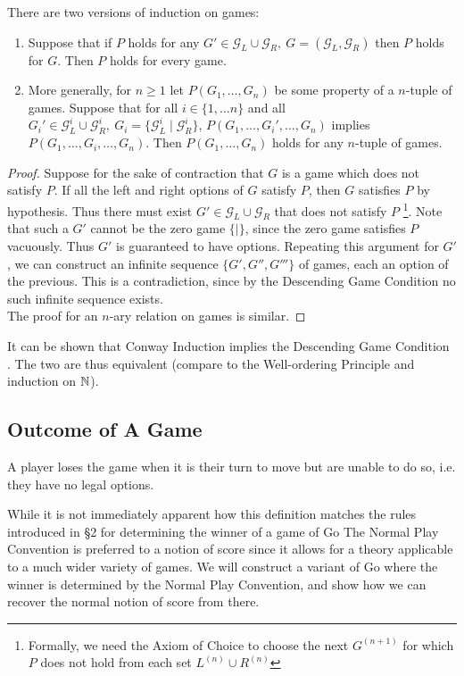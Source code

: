 \documentclass[../math194_paper.tex]{subfiles}
\begin{document}
\begin{theorem} There are two versions of induction on games:
\label{induction}
\begin{enumerate}
    \item Suppose that if $P$ holds for any $G' \in \mathcal{G}_L \cup \mathcal{G}_R, \: 
    G = (\mathcal{G}_L, \mathcal{G}_R)$ then $P$ holds for $G$.  
    Then $P$ holds for every game.
    \item More generally, for $n \geq 1$ let $P(G_1, \ldots, G_n)$ be some property of a $n$-tuple of games.  Suppose 
    that for all $i \in \{1, \ldots n\}$ and all $G_i' \in \mathcal{G}_L^i \cup \mathcal{G}_R^i, \: 
    G_i = \{\mathcal{G}_L^i \mid \mathcal{G}_R^i\}$,
    $P(G_1, \ldots, G_i', \ldots, G_n)$ implies $P(G_1, \ldots, G_i, \ldots, G_n)$. 
    Then $P(G_1, \ldots, G_n)$ holds for any $n$-tuple  of games.
\end{enumerate}
\end{theorem}

\begin{proof}
    Suppose for the sake of contraction that $G$ is a game which does not satisfy $P$. 
    If all the left and right options of $G$ satisfy $P$, then $G$ satisfies $P$ by hypothesis.
    Thus there must exist $G' \in \mathcal{G}_L \cup \mathcal{G}_R$ that does not satisfy $P$ 
    \footnote{Formally, we need 
    the Axiom of Choice to choose the next $G^{(n+1)}$ for which $P$ does not hold from each set 
    $L^{(n)} \cup R^{(n)}$}. Note that such a $G'$ cannot be the zero game $\{ \mid \}$, since the
    zero game satisfies $P$ vacuously. Thus $G'$ is guaranteed to have options.
    Repeating this argument for $G'$, we can construct an infinite sequence $\{G', G'', G''' \}$ of games,
    each an option of the previous. This is a contradiction, since by the Descending Game Condition 
    no such infinite sequence exists. \\
    The proof for an $n$-ary relation on games is similar. 
\end{proof}
It can be shown that Conway Induction implies the Descending Game Condition \cite{schleicher2006introduction}.
The two are thus equivalent (compare to the Well-ordering Principle and induction on $\mathbb{N}$).
\subsection{Outcome of A Game}

\begin{definition}
    A player loses the game when it is their turn to move but are unable to do so, i.e. they have
    no legal options.
\end{definition}
While it is not immediately apparent how this definition matches the rules introduced in \S 2
for determining the winner of a game of Go  The Normal Play Convention
is preferred to a notion of score since it allows for a theory applicable 
to a much wider variety of games. We will construct a variant of Go where the winner 
is determined by the Normal Play Convention, and show how we can recover the normal notion of
score from there. \\
\end{document}
